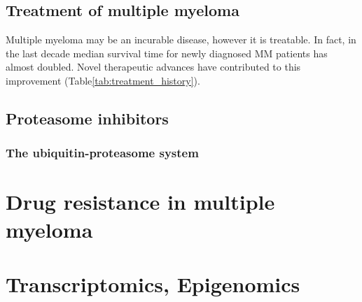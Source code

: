 \subsection{Treatment of multiple myeloma}
Multiple myeloma may be an incurable disease, however it is treatable.
In fact, in the last decade median survival time for newly diagnosed MM patients has almost doubled\cite{kazandjian2016look}.
Novel therapeutic advances have contributed to this improvement (Table\ref{tab:treatment_history}).



\subsection{Proteasome inhibitors}

\subsubsection{The ubiquitin-proteasome system}


\section{Drug resistance in multiple myeloma}


\section{Transcriptomics, Epigenomics}


\section{}